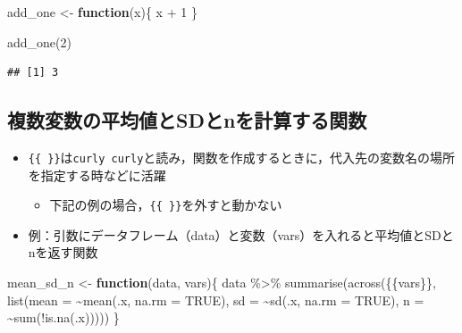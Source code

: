 \documentclass[
  xelatex,ja=standard, b5paper]{bxjsbook}
\newenvironment{Shaded}{\begin{snugshade}}{\end{snugshade}}
\newcommand{\AttributeTok}[1]{\textcolor[rgb]{0.77,0.63,0.00}{#1}}
\newcommand{\ConstantTok}[1]{\textcolor[rgb]{0.00,0.00,0.00}{#1}}
\newcommand{\ControlFlowTok}[1]{\textcolor[rgb]{0.13,0.29,0.53}{\textbf{#1}}}
\newcommand{\DecValTok}[1]{\textcolor[rgb]{0.00,0.00,0.81}{#1}}
\newcommand{\FunctionTok}[1]{\textcolor[rgb]{0.00,0.00,0.00}{#1}}
\newcommand{\NormalTok}[1]{#1}
\newcommand{\OtherTok}[1]{\textcolor[rgb]{0.56,0.35,0.01}{#1}}
\newcommand{\SpecialCharTok}[1]{\textcolor[rgb]{0.00,0.00,0.00}{#1}}
\providecommand{\tightlist}{%
  \setlength{\itemsep}{0pt}\setlength{\parskip}{0pt}}
\begin{document}
\begin{Shaded}
\begin{Highlighting}[]
\NormalTok{add\_one }\OtherTok{\textless{}{-}} 
  \ControlFlowTok{function}\NormalTok{(x)\{}
\NormalTok{    x }\SpecialCharTok{+} \DecValTok{1}
\NormalTok{  \}}

\FunctionTok{add\_one}\NormalTok{(}\DecValTok{2}\NormalTok{)}
\end{Highlighting}
\end{Shaded}

\begin{verbatim}
## [1] 3
\end{verbatim}

\hypertarget{su-fun-meansdn}{%
\subsection{複数変数の平均値とSDとnを計算する関数}\label{su-fun-meansdn}}

\begin{itemize}
\tightlist
\item
  \texttt{\{\{\ \}\}}は\texttt{curly\ curly}と読み，関数を作成するときに，代入先の変数名の場所を指定する時などに活躍

  \begin{itemize}
  \tightlist
  \item
    下記の例の場合，\texttt{\{\{\ \}\}}を外すと動かない
  \end{itemize}
\item
  例：引数にデータフレーム（data）と変数（vars）を入れると平均値とSDとnを返す関数
\end{itemize}

\begin{Shaded}
\begin{Highlighting}[]
\NormalTok{mean\_sd\_n }\OtherTok{\textless{}{-}} \ControlFlowTok{function}\NormalTok{(data, vars)\{}
\NormalTok{data }\SpecialCharTok{\%\textgreater{}\%} 
  \FunctionTok{summarise}\NormalTok{(}\FunctionTok{across}\NormalTok{(\{\{vars\}\},}
                   \FunctionTok{list}\NormalTok{(}\AttributeTok{mean =} \SpecialCharTok{\textasciitilde{}}\FunctionTok{mean}\NormalTok{(.x, }\AttributeTok{na.rm =} \ConstantTok{TRUE}\NormalTok{),}
                        \AttributeTok{sd =} \SpecialCharTok{\textasciitilde{}}\FunctionTok{sd}\NormalTok{(.x, }\AttributeTok{na.rm =} \ConstantTok{TRUE}\NormalTok{),}
                        \AttributeTok{n =} \SpecialCharTok{\textasciitilde{}}\FunctionTok{sum}\NormalTok{(}\SpecialCharTok{!}\FunctionTok{is.na}\NormalTok{(.x)))))}
\NormalTok{\}}
\end{Highlighting}
\end{Shaded}
\end{document}
